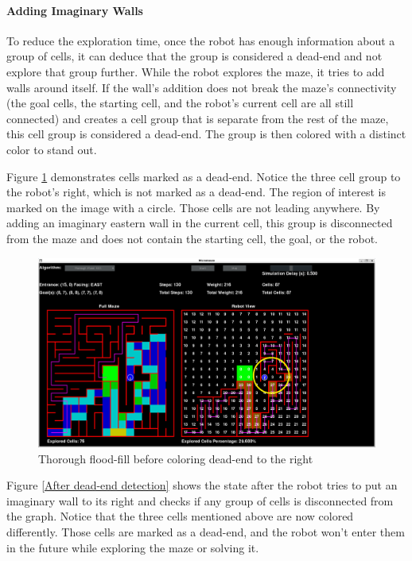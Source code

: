 \documentclass[12pt]{article}
\begin{document}
\paragraph{Adding Imaginary Walls}
To reduce the exploration time, once the robot has enough information about a group of \gls{cell}s, it can deduce that the group is considered a dead-end and not explore that group further.
While the robot explores the \gls{maze}, it tries to add walls around itself.
If the wall's addition does not break the \gls{maze}'s connectivity (the goal \gls{cell}s, the starting \gls{cell}, and the robot's current \gls{cell} are all still connected) and creates a \gls{cell} group that is separate from the rest of the \gls{maze}, this \gls{cell} group is considered a dead-end.
The group is then colored with a distinct color to stand out.

Figure \ref{Before dead-end detection} demonstrates \gls{cell}s marked as a dead-end.
Notice the three \gls{cell} group to the robot's right, which is not marked as a dead-end.
The region of interest is marked on the image with a circle.
Those \gls{cell}s are not leading anywhere.
By adding an imaginary eastern wall in the current \gls{cell}, this group is disconnected from the \gls{maze} and does not contain the starting \gls{cell}, the goal, or the robot.

\begin{figure}[H]
\centering
\includegraphics[width=\textwidth]{images/thorough_dead_end_before_c.png}
\caption{Thorough flood-fill before coloring dead-end to the right}
\label{Before dead-end detection}
\end{figure}

Figure \ref{After dead-end detection} shows the state after the robot tries to put an imaginary wall to its right and checks if any group of \gls{cell}s is disconnected from the graph.
Notice that the three \gls{cell}s mentioned above are now colored differently.
Those \gls{cell}s are marked as a dead-end, and the robot won't enter them in the future while exploring the \gls{maze} or solving it.
\end{document}
